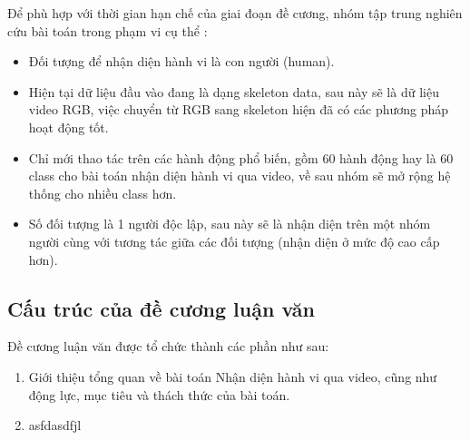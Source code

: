 Để phù hợp với thời gian  hạn chế của giai đoạn đề cương, nhóm tập trung nghiên cứu bài toán trong phạm vi cụ thể :
\begin{itemize}
    \item Đối tượng để nhận diện hành vi là con người (human).
    \item Hiện tại dữ liệu đầu vào đang là dạng skeleton data, sau này sẽ là dữ liệu video RGB, việc chuyển từ RGB sang skeleton hiện
          đã có các phương pháp hoạt động tốt.
    \item Chỉ mới thao tác trên các hành động phổ biến, gồm 60 hành động hay là 60 class cho bài toán nhận diện hành vi qua video, về sau nhóm sẽ mở rộng
          hệ thống cho nhiều class hơn.
    \item Số đối tượng là 1 người độc lập, sau này sẽ là nhận diện trên một nhóm người cùng với tương tác giữa các đối tượng (nhận diện ở mức độ cao cấp hơn).
\end{itemize}

\subsection{Cấu trúc của đề cương luận văn}
Đề cương luận văn được tổ chức thành các phần như sau:


\begin{enumerate}[Chương 1]
    \item Giới thiệu tổng quan về bài toán Nhận diện hành vi qua video, cũng như động lực, mục tiêu và thách thức của bài toán.
    \item asfdasdfjl

\end{enumerate}


